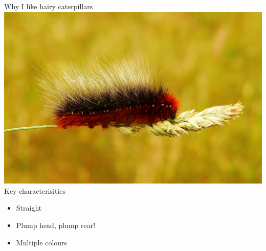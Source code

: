 \documentclass[compress]{beamer}
\begin{document}
\begin{frame}[label=sec-8-3a]{Why I like hairy caterpillars}
  \includegraphics[width=0.7\linewidth]{hairy_catapillar_1.jpg}\\
  Key characterisitics
  \begin{itemize}
    \item Straight
    \item Plump head, plump rear!
    \item Multiple colours
  \end{itemize}
\end{frame}
\end{document}
